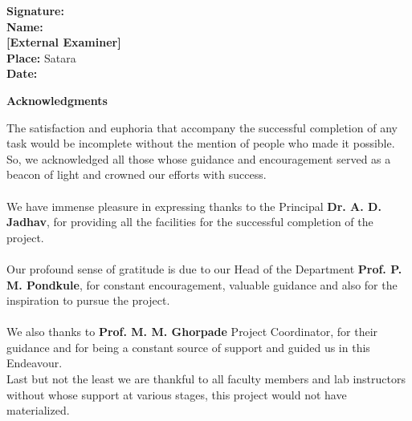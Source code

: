 \documentclass[12pt,a4paper]{report}
\begin{document}
\begin{flushleft}
\textbf{Signature:}\\[4pt]
\textbf{Name:}\\
\textbf{[External Examiner]}\\[20pt]

\textbf{Place:} Satara\\
\textbf{Date:}
\end{flushleft}
\newpage

\thispagestyle{empty}

\begin{center}
{\Large \bfseries \color{red} Acknowledgments}
\end{center}

\vspace{20pt}

\begin{justify}
{\normalsize
The satisfaction and euphoria that accompany the successful completion of any
task would be incomplete without the mention of people who made it possible.
So, we acknowledged all those whose guidance and encouragement served as a
beacon of light and crowned our efforts with success.\\ \\
We have immense pleasure in expressing thanks to the Principal
\textbf{Dr. A. D. Jadhav}, for providing all the facilities for the successful
completion of the project.\\ \\
Our profound sense of gratitude is due to our Head of the Department
\textbf{Prof. P. M. Pondkule}, for constant encouragement, valuable guidance and
also for the inspiration to pursue the project.\\ \\
We also thanks to \textbf{Prof. M. M. Ghorpade} Project Coordinator, for their guidance
and for being a constant source of support and guided us in this Endeavour.\\
Last but not the least we are thankful to all faculty members and lab instructors
without whose support at various stages, this project would not have materialized.\\ \\
}
\end{justify}

\vspace{40pt}
\end{document}
